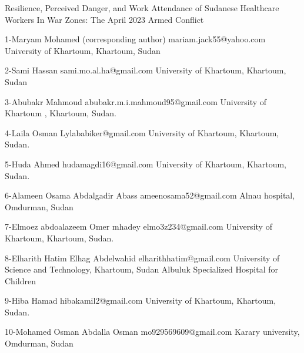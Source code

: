 Resilience, Perceived Danger, and Work Attendance of Sudanese Healthcare Workers In War Zones: The April 2023 Armed Conflict


1-Maryam Mohamed (corresponding author)
mariam.jack55@yahoo.com
University of Khartoum, Khartoum, Sudan 

2-Sami Hassan 
sami.mo.al.ha@gmail.com
University of Khartoum, Khartoum, Sudan 

3-Abubakr Mahmoud
abubakr.m.i.mahmoud95@gmail.com
University of Khartoum , Khartoum, Sudan.

4-Laila Osman
Lylababiker@gmail.com
University of Khartoum, Khartoum, Sudan.

5-Huda Ahmed 
hudamagdi16@gmail.com
University of Khartoum, Khartoum, Sudan.

6-Alameen Osama Abdalgadir Abass
ameenosama52@gmail.com
Alnau hospital, Omdurman, Sudan 

7-Elmoez abdoalazeem Omer mhadey
elmo3z234@gmail.com
University of Khartoum, Khartoum, Sudan.



8-Elharith Hatim Elhag Abdelwahid
elharithhatim@gmail.com
University of Science and Technology, Khartoum, Sudan 
Albuluk Specialized Hospital for Children

9-Hiba Hamad 
hibakamil2@gmail.com
University of Khartoum, Khartoum, Sudan.

10-Mohamed Osman Abdalla Osman
mo929569609@gmail.com
Karary university, Omdurman, Sudan 















